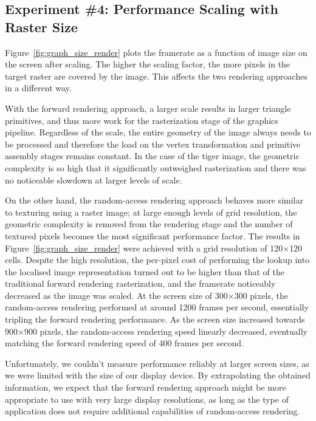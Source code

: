 \documentclass[11pt,a4paper,twoside]{article}
\begin{document}
\subsection {Experiment \#4: Performance Scaling with Raster Size}

Figure~\ref{fig:graph_size_render} plots the framerate as a function of image size on the screen after scaling. The higher the scaling factor, the more pixels in the target raster are covered by the image. This affects the two rendering approaches in a different way.

With the forward rendering approach, a larger scale results in larger triangle primitives, and thus more work for the rasterization stage of the graphics pipeline. Regardless of the scale, the entire geometry of the image always needs to be processed and therefore the load on the vertex transformation and primitive assembly stages remains constant. In the case of the tiger image, the geometric complexity is so high that it significantly outweighed rasterization and there was no noticeable slowdown at larger levels of scale.

On the other hand, the random-access rendering approach behaves more similar to texturing using a raster image; at large enough levels of grid resolution, the geometric complexity is removed from the rendering stage and the number of textured pixels becomes the most significant performance factor. The results in Figure~\ref{fig:graph_size_render} were achieved with a grid resolution of 120$\times$120 cells. Despite the high resolution, the per-pixel cost of performing the lookup into the localised image representation turned out to be higher than that of the traditional forward rendering rasterization, and the framerate noticeably decreased as the image was scaled. At the screen size of 300$\times$300 pixels, the random-access rendering performed at around 1200 frames per second, essentially tripling the forward rendering performance. As the screen size increased towards 900$\times$900 pixels, the random-access rendering speed linearly decreased, eventually matching the forward rendering speed of 400 frames per second.

Unfortunately, we couldn't measure performance reliably at larger screen sizes, as we were limited with the size of our display device. By extrapolating the obtained information, we expect that the forward rendering approach might be more appropriate to use with very large display resolutions, as long as the type of application does not require additional capabilities of random-access rendering.
\end{document}
